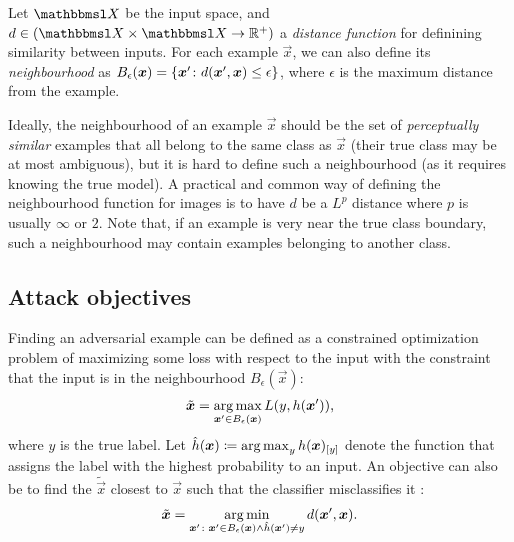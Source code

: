 \documentclass[oneside]{book}
\begin{document}
Let $\set X$ be the input space,
and $d\in(\set X\times\set X\to \R^+)$ a \textit{distance function} for definining similarity between inputs. 
For each example $\vec x$, 
we can also define its \textit{neighbourhood} as $B_{\epsilon}(\vec x) = \cbr{\vec x'\colon d(\vec x', \vec x) \leq \epsilon}$,
where $\epsilon$ is the maximum distance from the example.

Ideally, the neighbourhood of an example $\vec x$ should be the set of \textit{perceptually similar} examples that all belong to the same class as $\vec x$ (their true class may be at most ambiguous), but it is hard to define such a neighbourhood (as it requires knowing the true model). A practical and common way of defining the neighbourhood function for images is to have $d$ be a $L^p$ distance where $p$ is usually $\infty$ or $2$. Note that, if an example is very near the true class boundary, such a neighbourhood may contain examples belonging to another class. 

\subsection{Attack objectives}

Finding an adversarial example can be defined as a constrained optimization problem of maximizing some loss with respect to the input with the constraint that the input is in the neighbourhood $B_\epsilon(\vec x)$:
\begin{align}
\tilde{\vec x} = \argmax_{\vec x'\in B_\epsilon(\vec x)} L(y, h(\vec x')) \text{,} \label{eq:non-targeted-loss-attack}
\end{align}
where $y$ is the true label. Let $\hat{h}(\vec x) \coloneqq \argmax_{y} h(\vec x)_\ind{y}$ denote the function that assigns the label with the highest probability to an input.
An objective can also be to find the $\tilde{\vec x}$ closest to $\vec x$ such that the classifier misclassifies it \citep{Moosavi-Dezfooli:2016:DFSAMFDNN}:
\begin{align}
\tilde{\vec x} = \argmin_{\vec x'\colon \vec x'\in B_\epsilon(\vec x) \land \hat{h}(\vec x') \neq y} d(\vec x', \vec x) \text{.} \label{eq:non-targeted-closest-attack}
\end{align}
\end{document}
